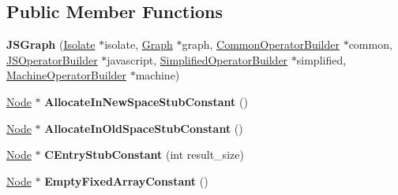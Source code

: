 \subsection*{Public Member Functions}
\begin{DoxyCompactItemize}
\item 
{\bfseries J\+S\+Graph} (\hyperlink{classv8_1_1internal_1_1_isolate}{Isolate} $\ast$isolate, \hyperlink{classv8_1_1internal_1_1compiler_1_1_graph}{Graph} $\ast$graph, \hyperlink{classv8_1_1internal_1_1compiler_1_1_common_operator_builder}{Common\+Operator\+Builder} $\ast$common, \hyperlink{classv8_1_1internal_1_1compiler_1_1_j_s_operator_builder}{J\+S\+Operator\+Builder} $\ast$javascript, \hyperlink{classv8_1_1internal_1_1compiler_1_1_simplified_operator_builder}{Simplified\+Operator\+Builder} $\ast$simplified, \hyperlink{classv8_1_1internal_1_1compiler_1_1_machine_operator_builder}{Machine\+Operator\+Builder} $\ast$machine)\hypertarget{classv8_1_1internal_1_1compiler_1_1_j_s_graph_ab86eb832ed84711836a88ce93d33f51f}{}\label{classv8_1_1internal_1_1compiler_1_1_j_s_graph_ab86eb832ed84711836a88ce93d33f51f}

\item 
\hyperlink{classv8_1_1internal_1_1compiler_1_1_node}{Node} $\ast$ {\bfseries Allocate\+In\+New\+Space\+Stub\+Constant} ()\hypertarget{classv8_1_1internal_1_1compiler_1_1_j_s_graph_a3caca9913fe29571af99d238d91d2c0d}{}\label{classv8_1_1internal_1_1compiler_1_1_j_s_graph_a3caca9913fe29571af99d238d91d2c0d}

\item 
\hyperlink{classv8_1_1internal_1_1compiler_1_1_node}{Node} $\ast$ {\bfseries Allocate\+In\+Old\+Space\+Stub\+Constant} ()\hypertarget{classv8_1_1internal_1_1compiler_1_1_j_s_graph_a01fda0d06fe62a50d9fb8f415c4a10f0}{}\label{classv8_1_1internal_1_1compiler_1_1_j_s_graph_a01fda0d06fe62a50d9fb8f415c4a10f0}

\item 
\hyperlink{classv8_1_1internal_1_1compiler_1_1_node}{Node} $\ast$ {\bfseries C\+Entry\+Stub\+Constant} (int result\+\_\+size)\hypertarget{classv8_1_1internal_1_1compiler_1_1_j_s_graph_a66aa0ac3e5c6b6577b53f84e071e6b8c}{}\label{classv8_1_1internal_1_1compiler_1_1_j_s_graph_a66aa0ac3e5c6b6577b53f84e071e6b8c}

\item 
\hyperlink{classv8_1_1internal_1_1compiler_1_1_node}{Node} $\ast$ {\bfseries Empty\+Fixed\+Array\+Constant} ()\hypertarget{classv8_1_1internal_1_1compiler_1_1_j_s_graph_a674ec95acd2dec0125e232b8ded18378}{}\label{classv8_1_1internal_1_1compiler_1_1_j_s_graph_a674ec95acd2dec0125e232b8ded18378}


\end{DoxyCompactItemize}
